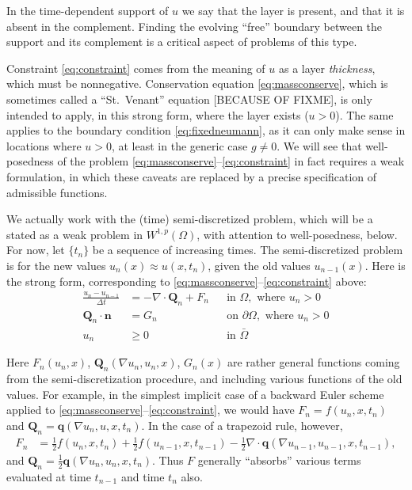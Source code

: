 \documentclass[final,leqno,onefignum,onetabnum]{siamltex1213bueler}
\newcommand\bn{\mathbf{n}}
\newcommand\bq{\mathbf{q}}
\newcommand\bQ{\mathbf{Q}}
\newcommand{\Div}{\nabla\cdot}
\renewcommand{\grad}{\nabla}
\begin{document}
In the time-dependent support of $u$ we say that the layer is present, and that it is absent in the complement.  Finding the evolving ``free'' boundary between the support and its complement is a critical aspect of problems of this type.

Constraint \eqref{eq:constraint} comes from the meaning of $u$ as a layer \emph{thickness}, which must be nonnegative.  Conservation equation \eqref{eq:massconserve}, which is sometimes called a ``St.~Venant'' equation [BECAUSE OF FIXME], is only intended to apply, in this strong form, where the layer exists ($u>0$).  The same applies to the boundary condition \eqref{eq:fixedneumann}, as it can only make sense in locations where $u>0$, at least in the generic case $g\ne 0$.  We will see that well-posedness of the problem \eqref{eq:massconserve}--\eqref{eq:constraint} in fact requires a weak formulation, in which these caveats are replaced by a precise specification of admissible functions.

We actually work with the (time) semi-discretized problem, which will be a stated as a weak problem in $W^{1,p}(\Omega)$, with attention to well-posedness, below.  For now, let $\{t_n\}$ be a sequence of increasing times.  The semi-discretized problem is for the new values $u_n(x) \approx u(x,t_n)$, given the old values $u_{n-1}(x)$.  Here is the strong form, corresponding to \eqref{eq:massconserve}--\eqref{eq:constraint} above:
\begin{align}
\frac{u_n - u_{n-1}}{\Delta t} &= - \Div \bQ_n + F_n &&\text{in } \Omega, \text{ where } u_n > 0 \label{eq:semimassconserve} \\
\bQ_n \cdot \bn &= G_n &&\text{on } \partial\Omega, \text{ where } u_n > 0 \label{eq:semifixedneumann} \\
u_n &\ge 0 &&\text{in } \bar\Omega \label{eq:semiconstraint}
\end{align}

Here $F_n(u_n,x)$, $\bQ_n(\grad u_n,u_n,x)$, $G_n(x)$ are rather general functions coming from the semi-discretization procedure, and including various functions of the old values.  For example, in the simplest implicit case of a backward Euler scheme applied to \eqref{eq:massconserve}--\eqref{eq:constraint}, we would have $F_n = f(u_n,x,t_n)$ and $\bQ_n = \bq(\grad u_n,u,x,t_n)$.  In the case of a trapezoid rule, however,
\begin{align*}
F_n &= \frac{1}{2} f(u_n,x,t_n) + \frac{1}{2} f(u_{n-1},x,t_{n-1}) - \frac{1}{2} \Div \bq(\grad u_{n-1},u_{n-1},x,t_{n-1}),
\end{align*}
and $\bQ_n = \frac{1}{2} \bq(\grad u_n,u_n,x,t_n)$.  Thus $F$ generally ``absorbs'' various terms evaluated at time $t_{n-1}$ and time $t_n$ also.
\end{document}
